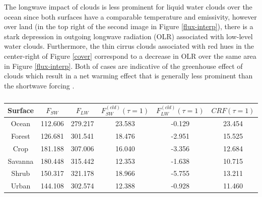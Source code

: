 \documentclass[12pt]{article}
\begin{document}
    The longwave impact of clouds is less prominent for liquid water clouds over the ocean since both surfaces have a comparable temperature and emissivity, however over land (in the top right of the second image in Figure \ref{flux-interp}), there is a stark depression in outgoing longwave radiation (OLR) associated with low-level water clouds. Furthermore, the thin cirrus clouds associated with red hues in the center-right of Figure \ref{cover} correspond to a decrease in OLR over the same area in Figure \ref{flux-interp}. Both of cases are indicative of the greenhouse effect of clouds which result in a net warming effect that is generally less prominent than the shortwave forcing \cite{ramanathan_cloud-radiative_1989}.

\begin{table}[h!]\label{}
    \centering
    \begin{tabular}{c | c c | c c | c}
        Surface & $F_{SW} $ & $F_{LW}$ & $F_{SW}^{(cld)}(\tau = 1)$ & $F_{LW}^{(cld)}(\tau = 1)$ & $CRF(\tau = 1)$ \\
        \hline
        Ocean & 112.606 & 279.217 & 23.583 & -0.129 & 23.454 \\
        Forest & 126.681 & 301.541 & 18.476 & -2.951 & 15.525 \\
        Crop & 181.188 & 307.006 & 16.040 & -3.356 & 12.684 \\
        Savanna & 180.448 & 315.442 & 12.353 & -1.638 & 10.715 \\
        Shrub & 150.317 & 321.178 & 18.966 & -5.755 & 13.211 \\
        Urban & 144.108 & 302.574 & 12.388 & -0.928 & 11.460 \\
    \end{tabular}
    \caption{}
\end{table}
\end{document}
